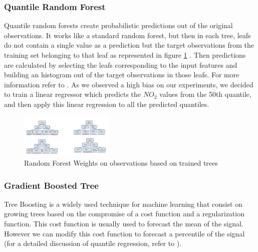 \documentclass[a4paper,twocolumn,5p]{elsarticle}
\begin{document}
\subsubsection{Quantile Random Forest}

Quantile random forests create probabilistic predictions out of 
the original observations. It works like a standard random forest, but then in each tree,
leafs do not contain a single value as a prediction but the target observations from the training set 
belonging to that leaf as represented in figure \ref{figure:qrandom} . 
Then predictions are calculated by selecting the leafs corresponding to the input features and 
building an histogram out of the target observations in those leafs. For more information refer to 
\cite{quantregforests}.
As we observed a high bias on our experiments, we decided to train a linear regressor
which predicts the $NO_2$ values from the 50th quantile, and then apply this linear regression 
to all the predicted quantiles. 

\begin{figure}
  \centering
  \includegraphics[width=0.4\textwidth]{quantile_random_forest}
  \caption{Random Forest Weights on observations based on trained trees}
  \label{figure:qrandom}
\end{figure}

\subsubsection{Gradient Boosted Tree}

Tree Boosting \cite{gradientboost} is a widely used technique for machine learning 
that consist on growing trees based on the compromise 
of a cost function and a regularization function. This cost function is usually used to forecast 
the mean of the signal. However we can modify this cost function to forecast a 
percentile of the signal (for a detailed discussion of 
quantile regression, refer to \cite{koenker_quantile_2005}). 
\end{document}
